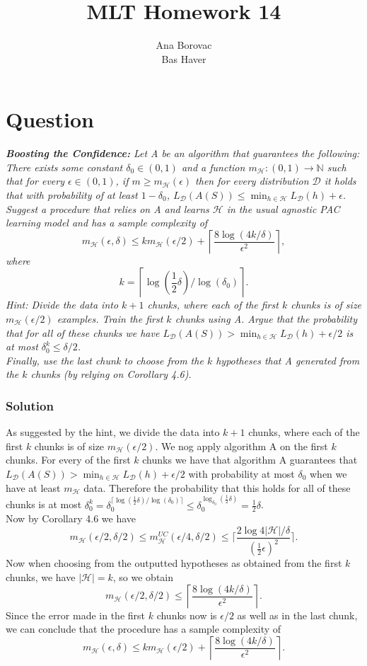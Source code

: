 \documentclass{article}
\title{MLT Homework 14}
\author{Ana Borovac  \\ Bas Haver}
\newcounter{counterquestion}
\newenvironment{question}[1]
{
\stepcounter{counterquestion}
\section*{Question \thecounterquestion}
\emph{#1} 
} 
{
}
\newenvironment{solution}
{
\subsubsection*{Solution}
} 
{
}
\begin{document}
\maketitle

\begin{question}{\textbf{Boosting the Confidence:} Let A be an algorithm that guarantees the following: There exists some constant $\delta _0 \in (0,1)$ and a function $m_{\mathcal{H}}:(0,1)\to \mathbb{N}$ such that for every $\epsilon \in (0,1)$, if $m\geq m_{\mathcal{H}}(\epsilon )$ then for every distribution $\mathcal{D}$ it holds that with probability of at least $1-\delta _0$, $L_{\mathcal{D}}(A(S))\leq \min _{h \in \mathcal{H}} L_{\mathcal{D}}(h)+\epsilon$.\\
Suggest a procedure that relies on A and learns $\mathcal{H}$ in the usual agnostic PAC learning model and has a sample complexity of \[ m_{\mathcal{H}}(\epsilon, \delta) \leq k m_{\mathcal{H}}(\epsilon/2) + \left\lceil \frac{8 \log(4k/\delta)}{\epsilon^2} \right\rceil, \]
where \[ k = \left\lceil \log \left( \frac{1}{2} \delta \right) / \log(\delta_0) \right\rceil. \]
\textit{Hint:} Divide the data into $k+1$ chunks, where each of the first $k$ chunks is of size $m_{\mathcal{H}}(\epsilon/2 )$ examples. Train the first $k$ chunks using A. Argue that the probability that for all of these chunks we have $L_{\mathcal{D}}(A(S))>\min _{h \in \mathcal{H}}L_{\mathcal{D}}(h)+\epsilon/2$ is at most $\delta _0 ^k \leq \delta /2$.\\
Finally, use the last chunk to choose from the $k$ hypotheses that A generated from the $k$ chunks (by relying on Corollary 4.6).}
\begin{solution}
As suggested by the hint, we divide the data into $k+1$ chunks, where each of the first $k$ chunks is of size $m_{\mathcal{H}}(\epsilon/2 )$. We nog apply algorithm A on the first $k$ chunks. For every of the first $k$ chunks we have that algorithm A guarantees that $L_{\mathcal{D}}(A(S))> \min _{h \in \mathcal{H}} L_{\mathcal{D}}(h)+\epsilon/2$ with probability at most $\delta _0$ when we have at least $m_{\mathcal{H}}$ data. Therefore the probability that this holds for all of these chunks is at most $\delta _0 ^k=\delta _0 ^{\lceil \log (\frac{1}{2}\delta ) / \log (\delta _0 ) \rceil} \leq \delta_0 ^{\log _{\delta _0 }(\frac{1}{2}\delta )} = \frac{1}{2}\delta$.\\
Now by Corollary 4.6 we have $$m_{\mathcal{H}}(\epsilon/2 , \delta /2) \leq m_{\mathcal{H}}^{UC}(\epsilon /4, \delta /2 ) \leq \lceil \frac{2\log 4|\mathcal{H}|/\delta}{(\frac{1}{2}\epsilon )^2}\rceil.$$
Now when choosing from the outputted hypotheses as obtained from the first $k$ chunks, we have $|\mathcal{H}|=k$, so we obtain $$m_{\mathcal{H}}(\epsilon/2 , \delta /2) \leq \left\lceil \frac{8 \log(4k/\delta)}{\epsilon^2} \right\rceil.$$
Since the error made in the first $k$ chunks now is $\epsilon /2$ as well as in the last chunk, we can conclude that the procedure has a sample complexity of \[ m_{\mathcal{H}}(\epsilon, \delta) \leq k m_{\mathcal{H}}(\epsilon/2) + \left\lceil \frac{8 \log(4k/\delta)}{\epsilon^2} \right\rceil. \]
\end{solution}
\end{question}
\end{document}
